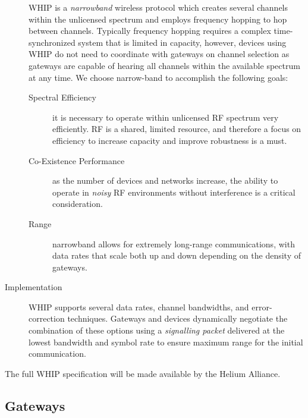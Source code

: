 \documentclass[10pt, nonatbib, nocopyrightspace, reprint]{sigplanconf}
\begin{document}
\begin{description}
        WHIP is a \emph{narrowband} wireless protocol which creates several channels within the unlicensed spectrum and employs frequency hopping to hop between channels. Typically frequency hopping requires a complex time-synchronized system that is limited in capacity, however, devices using WHIP do not need to coordinate with gateways on channel selection as gateways are capable of hearing all channels within the available spectrum at any time. We choose narrow-band to accomplish the following goals:

        \begin{description}
                \item[Spectral Efficiency] it is necessary to operate within unlicensed RF spectrum very efficiently. RF is a shared, limited resource, and therefore a focus on efficiency to increase capacity and improve robustness is a must.
                \item[Co-Existence Performance] as the number of devices and networks increase, the ability to operate in \emph{noisy} RF environments without interference is a critical consideration.
                \item[Range] narrowband allows for extremely long-range communications, with data rates that scale both up and down depending on the density of gateways.
        \end{description}

        \item [Implementation] WHIP supports several data rates, channel bandwidths, and error-correction techniques. Gateways and devices dynamically negotiate the combination of these options using a \emph{signalling packet} delivered at the lowest bandwidth and symbol rate to ensure maximum range for the initial communication.
\end{description}

The full WHIP specification will be made available by the Helium Alliance.

\subsection{Gateways}\label{gateways}
\end{document}
